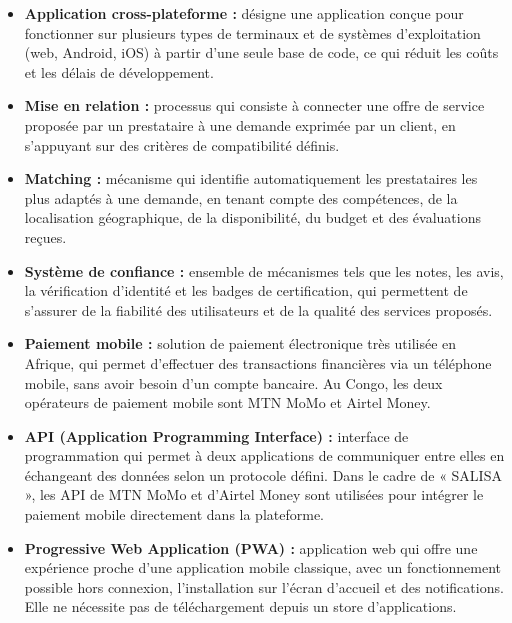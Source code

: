 \begin{itemize}
	\item[\textbf{-}] \textbf{Application cross-plateforme :} désigne une application conçue pour fonctionner sur plusieurs types de terminaux et de systèmes d'exploitation (web, Android, iOS) à partir d'une seule base de code, ce qui réduit les coûts et les délais de développement.
	
	\item[\textbf{-}] \textbf{Mise en relation :} processus qui consiste à connecter une offre de service proposée par un prestataire à une demande exprimée par un client, en s'appuyant sur des critères de compatibilité définis.
	
	\item[\textbf{-}] \textbf{Matching :} mécanisme qui identifie automatiquement les prestataires les plus adaptés à une demande, en tenant compte des compétences, de la localisation géographique, de la disponibilité, du budget et des évaluations reçues.
	
	\item[\textbf{-}] \textbf{Système de confiance :} ensemble de mécanismes tels que les notes, les avis, la vérification d'identité et les badges de certification, qui permettent de s'assurer de la fiabilité des utilisateurs et de la qualité des services proposés.
	
	\item[\textbf{-}] \textbf{Paiement mobile :} solution de paiement électronique très utilisée en Afrique, qui permet d'effectuer des transactions financières via un téléphone mobile, sans avoir besoin d'un compte bancaire. Au Congo, les deux opérateurs de paiement mobile sont MTN MoMo et Airtel Money.
	
	\item[\textbf{-}] \textbf{API (Application Programming Interface) :} interface de programmation qui permet à deux applications de communiquer entre elles en échangeant des données selon un protocole défini. Dans le cadre de « SALISA », les API de MTN MoMo et d'Airtel Money sont utilisées pour intégrer le paiement mobile directement dans la plateforme.
	
	\item[\textbf{-}] \textbf{Progressive Web Application (PWA) :} application web qui offre une expérience proche d'une application mobile classique, avec un fonctionnement possible hors connexion, l'installation sur l'écran d'accueil et des notifications. Elle ne nécessite pas de téléchargement depuis un store d'applications.
	

\end{itemize}
